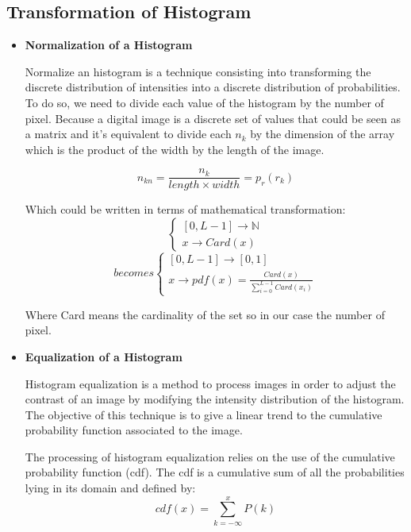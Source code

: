 \documentclass[12pt]{article}
\begin{document}
	\subsection{Transformation of Histogram}
	\begin{itemize}
		\item \textbf{Normalization of a Histogram}
		
		Normalize an histogram is a technique consisting into transforming the discrete distribution of intensities into a discrete distribution of probabilities. To do so, we need to divide each value of the histogram by the number of pixel. Because a digital image is a discrete set of values that could be seen as a matrix and it's equivalent to divide each $n_k$ by the dimension of the array which is the product of the width by the length of the image.
		
		\begin{equation}
			n_{kn} = \frac{n_k}{length \times width} = p_{r}(r_k)
		\end{equation}
		
		Which could be written in terms of mathematical transformation:
		\begin{equation}
			\begin{cases}
				[0, L-1] \rightarrow \mathbb{N} \\
				x \rightarrow Card(x) 
			\end{cases}
		\end{equation}
		\begin{equation}
			becomes \begin{cases}
				[0, L-1] \rightarrow [0, 1] \\
				x \rightarrow pdf(x) = \frac{Card(x)}{\sum_{i=0}^{L-1} Card(x_i)}
			\end{cases}
		\end{equation}
	
		Where Card means the cardinality of the set so in our case the number of pixel.
		
		\item \textbf{Equalization of a Histogram}
		
		Histogram equalization is a method to process images in order to adjust the contrast of an image by modifying the intensity distribution of the histogram. The objective of this technique is to give a linear trend to the cumulative probability function associated to the image.
		
		The processing of histogram equalization relies on the use of the cumulative probability function (cdf). The cdf is a cumulative sum of all the probabilities lying in its domain and defined by:
		\begin{equation}
			cdf(x) = \sum_{k=-\infty}^{x} P(k)
		\end{equation}
		

\end{itemize}
\end{document}
